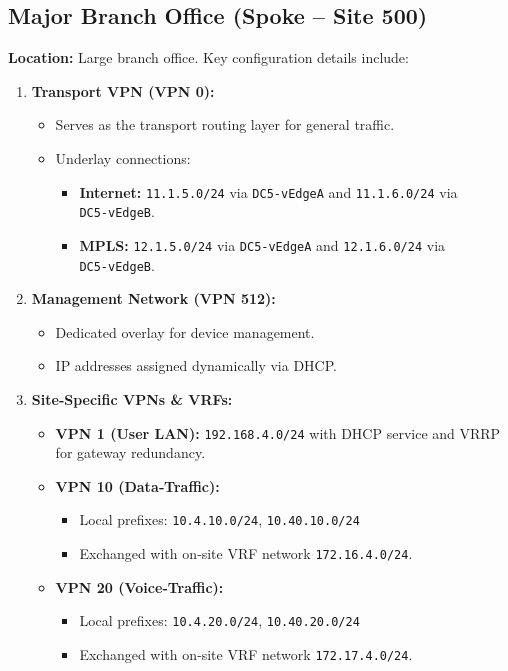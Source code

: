 \documentclass[12pt,english]{report}
\begin{document}
\subsection{Major Branch Office (Spoke – Site 500)}
\textbf{Location:} Large branch office.
Key configuration details include:
\begin{enumerate}
    \item \textbf{Transport VPN (VPN 0):}
    \begin{itemize}
        \item Serves as the transport routing layer for general traffic.
        \item Underlay connections:
        \begin{itemize}
            \item \textbf{Internet:} \texttt{11.1.5.0/24} via \texttt{DC5‑vEdgeA} and \texttt{11.1.6.0/24} via \texttt{DC5‑vEdgeB}.
            \item \textbf{MPLS:} \texttt{12.1.5.0/24} via \texttt{DC5‑vEdgeA} and \texttt{12.1.6.0/24} via \texttt{DC5‑vEdgeB}.
        \end{itemize}
    \end{itemize}

    \item \textbf{Management Network (VPN 512):}
    \begin{itemize}
        \item Dedicated overlay for device management.
        \item IP addresses assigned dynamically via DHCP.
    \end{itemize}

    \item \textbf{Site‑Specific VPNs \& VRFs:}
    \begin{itemize}
        \item \textbf{VPN 1 (User LAN):} \texttt{192.168.4.0/24} with DHCP service and VRRP for gateway redundancy.
        \item \textbf{VPN 10 (Data‑Traffic):}  
        \begin{itemize}
            \item Local prefixes: \texttt{10.4.10.0/24}, \texttt{10.40.10.0/24}  
            \item Exchanged with on‑site VRF network \texttt{172.16.4.0/24}.
        \end{itemize}
        \item \textbf{VPN 20 (Voice‑Traffic):}  
        \begin{itemize}
            \item Local prefixes: \texttt{10.4.20.0/24}, \texttt{10.40.20.0/24}  
            \item Exchanged with on‑site VRF network \texttt{172.17.4.0/24}.
        \end{itemize}
    \end{itemize}


\end{enumerate}
\end{document}
